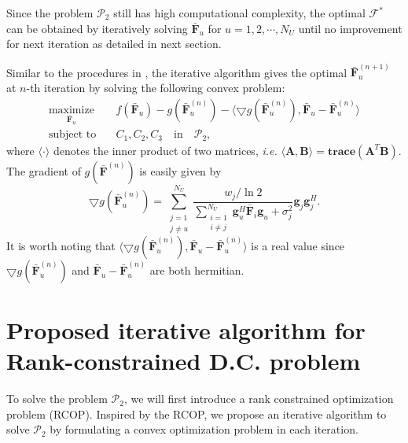 \documentclass[10pt,journal,twocolumn,twoside]{IEEEtran}
\begin{document}
Since the problem $\mathcal{P}_2$ still has high computational complexity, the optimal $\bm{\mathcal{F}}^*$ can be obtained by iteratively solving $\bar{\bm{F}}_u$ for $u = 1,2,\cdots, N_U$ until no improvement for next iteration as detailed in next section.

Similar to the procedures in \cite{kha2012fast}, the iterative algorithm gives the optimal $\bar{\bm{F}}_u^{(n+1)}$ at $n$-th iteration by solving the following convex problem:
\begin{align}\label{DC}
\underset{\bar{\bm{F}}_u}{\text{maximize}}&\quad f(\bar{\bm{F}}_u) - g(\bar{\bm{F}}^{(n)}_u) - \langle \bigtriangledown g(\bar{\bm{F}}^{(n)}_u), \bar{\bm{F}}_u -  \bar{\bm{F}}_u^{(n)} \rangle\\ \nonumber
\text{subject to}& \quad C_1, C_2, C_3\quad \text{in} \quad \mathcal{P}_2,
\end{align}
where $\langle \cdot \rangle$ denotes the inner product of two matrices, \textit{i.e.} $\langle \bm{A}, \bm{B} \rangle = \textbf{trace}(\bm{A}^T \bm{B})$. The gradient of $g(\bar{\bm{F}}^{(n)})$ is easily given by
\begin{equation}
	\bigtriangledown g(\bar{\bm{F}}^{(n)}_u) = \sum_{\substack{j=1 \\ j\neq u}}^{N_U}\frac{w_j/\ln 2}{\sum_{\substack{i=1 \\ i\neq j}}^{N_U} \bm{g}_{u}^H \bar{\bm{F}}_i\bm{g}_{u} +\sigma^2_j} \bm{g}_{j} \bm{g}_{j}^H.
\end{equation}
It is worth noting that $\langle \bigtriangledown g(\bar{\bm{F}}^{(n)}_u), \bar{\bm{F}}_u -  \bar{\bm{F}}_u^{(n)} \rangle$ is a real value since $\bigtriangledown g(\bar{\bm{F}}^{(n)}_u)$ and $\bar{\bm{F}}_u -  \bar{\bm{F}}_u^{(n)}$ are both hermitian.

\section{Proposed iterative algorithm for Rank-constrained D.C. problem}

To solve the problem $\mathcal{P}_2$, we will first introduce a rank constrained optimization problem (RCOP). Inspired by the RCOP, we propose an iterative algorithm to solve $\mathcal{P}_2$ by formulating a convex optimization problem in each iteration.
\end{document}
